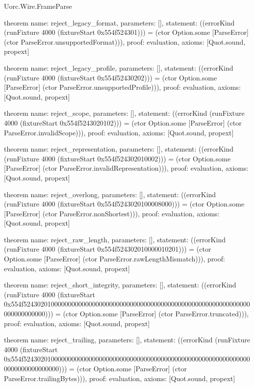 \begin{lexlean}{Uorc.Wire.FrameParse}
\begin{semanticmodule}
theorem{
  name: reject_legacy_format,
  parameters: [],
  statement: ((errorKind (runFixture 4000 (fixtureStart 0x554f524301))) = (ctor Option.some [ParseError] (ctor ParseError.unsupportedFormat))),
  proof: evaluation{},
  axioms: [Quot.sound, propext]
}

theorem{
  name: reject_legacy_profile,
  parameters: [],
  statement: ((errorKind (runFixture 4000 (fixtureStart 0x554f52430202))) = (ctor Option.some [ParseError] (ctor ParseError.unsupportedProfile))),
  proof: evaluation{},
  axioms: [Quot.sound, propext]
}

theorem{
  name: reject_scope,
  parameters: [],
  statement: ((errorKind (runFixture 4000 (fixtureStart 0x554f5243020102))) = (ctor Option.some [ParseError] (ctor ParseError.invalidScope))),
  proof: evaluation{},
  axioms: [Quot.sound, propext]
}

theorem{
  name: reject_representation,
  parameters: [],
  statement: ((errorKind (runFixture 4000 (fixtureStart 0x554f524302010002))) = (ctor Option.some [ParseError] (ctor ParseError.invalidRepresentation))),
  proof: evaluation{},
  axioms: [Quot.sound, propext]
}

theorem{
  name: reject_overlong,
  parameters: [],
  statement: ((errorKind (runFixture 4000 (fixtureStart 0x554f5243020100008000))) = (ctor Option.some [ParseError] (ctor ParseError.nonShortest))),
  proof: evaluation{},
  axioms: [Quot.sound, propext]
}

theorem{
  name: reject_raw_length,
  parameters: [],
  statement: ((errorKind (runFixture 4000 (fixtureStart 0x554f524302010000010201))) = (ctor Option.some [ParseError] (ctor ParseError.rawLengthMismatch))),
  proof: evaluation{},
  axioms: [Quot.sound, propext]
}

theorem{
  name: reject_short_integrity,
  parameters: [],
  statement: ((errorKind (runFixture 4000 (fixtureStart 0x554f524302010000000000000000000000000000000000000000000000000000000000000000000000))) = (ctor Option.some [ParseError] (ctor ParseError.truncated))),
  proof: evaluation{},
  axioms: [Quot.sound, propext]
}

theorem{
  name: reject_trailing,
  parameters: [],
  statement: ((errorKind (runFixture 4000 (fixtureStart 0x554f5243020100000000000000000000000000000000000000000000000000000000000000000000000000))) = (ctor Option.some [ParseError] (ctor ParseError.trailingBytes))),
  proof: evaluation{},
  axioms: [Quot.sound, propext]
}


\end{semanticmodule}
\end{lexlean}

